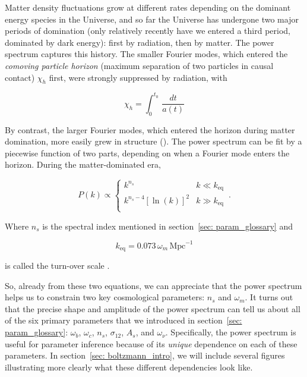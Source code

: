 Matter density fluctuations grow at different rates depending on 
the dominant energy species in the Universe, and so far the Universe has
undergone two major periods of domination (only relatively
recently have we entered a third period, dominated by dark energy): first by 
radiation, then by matter. The power spectrum captures this history. The
smaller Fourier modes, which entered the \textit{comoving particle horizon} 
(maximum
separation of two particles in causal contact) $\chi_h$ first, were strongly
suppressed by radiation, with

\begin{equation}
\chi_h = \int_0^{t_0} \, \frac{dt}{a(t)}
\end{equation}

By contrast, the larger Fourier modes, which
entered the horizon during matter domination, more easily grew in structure
(). The power spectrum can be fit by a piecewise function of 
two parts, depending on when a Fourier mode enters the horizon.
During the matter-dominated era, 

\begin{equation}
\label{eq: n_s}
P(k) \propto 
\begin{cases}
      k^{n_s} & k \ll k_\text{eq} \\
      k^{n_s - 4} [\ln (k)]^2 & k \gg k_\text{eq} \\ 
    \end{cases}\,.
\end{equation}

Where $n_s$ is the spectral index mentioned in
section~\ref{sec: param_glossary} and

\begin{equation}
\label{eq: turnover}
k_\text{eq} = 0.073 \, \omega_m \, \mathrm{Mpc}^{-1}
\end{equation}

is called the turn-over scale .


So, already from these two equations, we can
appreciate that the power spectrum helps us to constrain two key cosmological
parameters: $n_s$ and $\omega_m$. It turns out that the precise shape and
amplitude of the power spectrum can tell us about all of the six primary
parameters that we introduced in section~\ref{sec: param_glossary}:
$\omega_b$, $\omega_c$, $n_s$, $\sigma_{12}$, $A_s$, and $\omega_\nu$. 
Specifically, the power spectrum is useful for parameter inference because of
its \textit{unique} dependence on each of these parameters. In 
section~\ref{sec: boltzmann_intro}, we will include several figures 
illustrating more clearly what these different dependencies look like.

